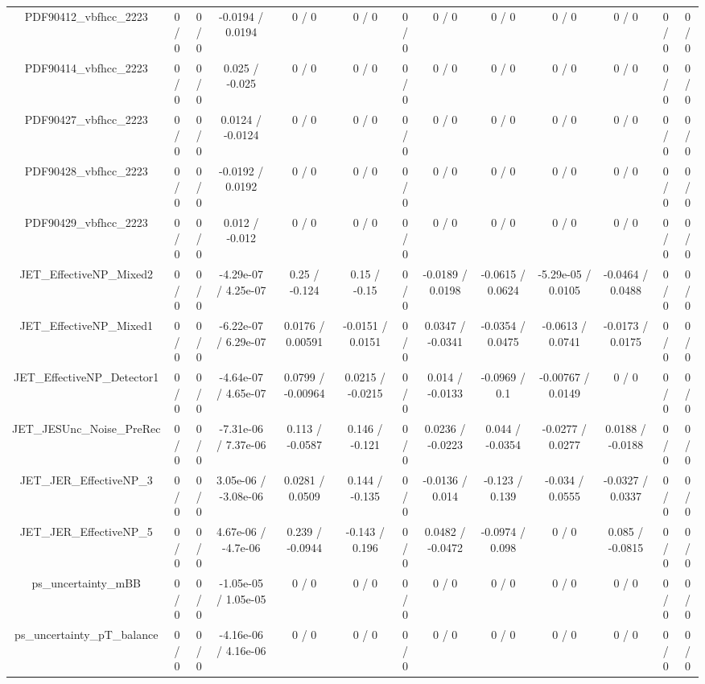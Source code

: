 \documentclass[10pt]{article}
\begin{document}
\begin{table}[htbp]
\begin{center}
\begin{tabular}{|c|c|c|c|c|c|c|c|c|c|c|c|c|}
  PDF90412_vbfhcc_2223 & 0 / 0 & 0 / 0 & -0.0194 / 0.0194 & 0 / 0 & 0 / 0 & 0 / 0 & 0 / 0 & 0 / 0 & 0 / 0 & 0 / 0 & 0 / 0 & 0 / 0 \\ 
  PDF90414_vbfhcc_2223 & 0 / 0 & 0 / 0 & 0.025 / -0.025 & 0 / 0 & 0 / 0 & 0 / 0 & 0 / 0 & 0 / 0 & 0 / 0 & 0 / 0 & 0 / 0 & 0 / 0 \\ 
  PDF90427_vbfhcc_2223 & 0 / 0 & 0 / 0 & 0.0124 / -0.0124 & 0 / 0 & 0 / 0 & 0 / 0 & 0 / 0 & 0 / 0 & 0 / 0 & 0 / 0 & 0 / 0 & 0 / 0 \\ 
  PDF90428_vbfhcc_2223 & 0 / 0 & 0 / 0 & -0.0192 / 0.0192 & 0 / 0 & 0 / 0 & 0 / 0 & 0 / 0 & 0 / 0 & 0 / 0 & 0 / 0 & 0 / 0 & 0 / 0 \\ 
  PDF90429_vbfhcc_2223 & 0 / 0 & 0 / 0 & 0.012 / -0.012 & 0 / 0 & 0 / 0 & 0 / 0 & 0 / 0 & 0 / 0 & 0 / 0 & 0 / 0 & 0 / 0 & 0 / 0 \\ 
  JET_EffectiveNP_Mixed2 & 0 / 0 & 0 / 0 & -4.29e-07 / 4.25e-07 & 0.25 / -0.124 & 0.15 / -0.15 & 0 / 0 & -0.0189 / 0.0198 & -0.0615 / 0.0624 & -5.29e-05 / 0.0105 & -0.0464 / 0.0488 & 0 / 0 & 0 / 0 \\ 
  JET_EffectiveNP_Mixed1 & 0 / 0 & 0 / 0 & -6.22e-07 / 6.29e-07 & 0.0176 / 0.00591 & -0.0151 / 0.0151 & 0 / 0 & 0.0347 / -0.0341 & -0.0354 / 0.0475 & -0.0613 / 0.0741 & -0.0173 / 0.0175 & 0 / 0 & 0 / 0 \\ 
  JET_EffectiveNP_Detector1 & 0 / 0 & 0 / 0 & -4.64e-07 / 4.65e-07 & 0.0799 / -0.00964 & 0.0215 / -0.0215 & 0 / 0 & 0.014 / -0.0133 & -0.0969 / 0.1 & -0.00767 / 0.0149 & 0 / 0 & 0 / 0 & 0 / 0 \\ 
  JET_JESUnc_Noise_PreRec & 0 / 0 & 0 / 0 & -7.31e-06 / 7.37e-06 & 0.113 / -0.0587 & 0.146 / -0.121 & 0 / 0 & 0.0236 / -0.0223 & 0.044 / -0.0354 & -0.0277 / 0.0277 & 0.0188 / -0.0188 & 0 / 0 & 0 / 0 \\ 
  JET_JER_EffectiveNP_3 & 0 / 0 & 0 / 0 & 3.05e-06 / -3.08e-06 & 0.0281 / 0.0509 & 0.144 / -0.135 & 0 / 0 & -0.0136 / 0.014 & -0.123 / 0.139 & -0.034 / 0.0555 & -0.0327 / 0.0337 & 0 / 0 & 0 / 0 \\ 
  JET_JER_EffectiveNP_5 & 0 / 0 & 0 / 0 & 4.67e-06 / -4.7e-06 & 0.239 / -0.0944 & -0.143 / 0.196 & 0 / 0 & 0.0482 / -0.0472 & -0.0974 / 0.098 & 0 / 0 & 0.085 / -0.0815 & 0 / 0 & 0 / 0 \\ 
  ps_uncertainty_mBB & 0 / 0 & 0 / 0 & -1.05e-05 / 1.05e-05 & 0 / 0 & 0 / 0 & 0 / 0 & 0 / 0 & 0 / 0 & 0 / 0 & 0 / 0 & 0 / 0 & 0 / 0 \\ 
  ps_uncertainty_pT_balance & 0 / 0 & 0 / 0 & -4.16e-06 / 4.16e-06 & 0 / 0 & 0 / 0 & 0 / 0 & 0 / 0 & 0 / 0 & 0 / 0 & 0 / 0 & 0 / 0 & 0 / 0 \\ 

\end{tabular}
\end{center}
\end{table}
\end{document}
